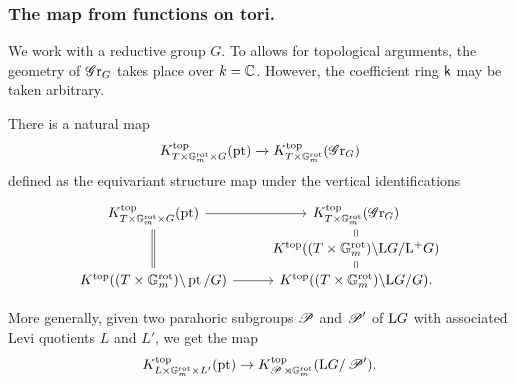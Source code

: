 \subsubsection{The map from functions on tori.}\label{section: the map from functions on tori}
We work with a reductive group $G$.
To allows for topological arguments, the geometry of $\operatorname{\mathscr{G}r}_G$ takes place over $k=\operatorname{\mathbb{C}}$. However, the coefficient ring $\mathsf{k}$ may be taken arbitrary.

There is a natural map
\begin{equation*}
 K^{\mathrm{top}}_{T \times \mathbb{G}_m^{\mathrm{rot}} \times G}(\operatorname{pt}) \xrightarrow{} K^{\mathrm{top}}_{T \times \mathbb{G}_m^{\mathrm{rot}}}(\operatorname{\mathscr{G}r}_G)  
\end{equation*}
defined as the equivariant structure map under the vertical identifications
\begin{equation*}
    \begin{tikzcd}[row sep=5]
      K^{\top}_{T \times \Gm^{\rot} \times G}(\pt) \arrow[r] & K^{\top}_{T \times \Gm^{\rot}}(\Gr_G) \\
      & K^{\top}((T \times \Gm^{\rot}) \backslash \lo G / \lop G) \arrow[u, equal] \\
      K^{\top}((T \times \Gm^{\rot}) \backslash \pt / G) \arrow[uu, equal] \arrow[r] & K^{\top}((T \times \Gm^{\rot}) \backslash \lo G / G) \arrow[u, equal].
    \end{tikzcd}
\end{equation*}

\begin{remark}
More generally, given two parahoric subgroups $\operatorname{\mathscr{P}}$ and $\operatorname{\mathscr{P}}'$ of $\mathrm{L} G$ with associated Levi quotients $L$ and $L'$, we get the map
\begin{equation*}
 K^{\mathrm{top}}_{L \times \mathbb{G}_m^{\mathrm{rot}} \times L'}(\operatorname{pt}) \to K^{\mathrm{top}}_{\operatorname{\mathscr{P}} \rtimes \mathbb{G}_m^{\mathrm{rot}}}(\mathrm{L} G/ \operatorname{\mathscr{P}}').  
\end{equation*}    
\end{remark}

